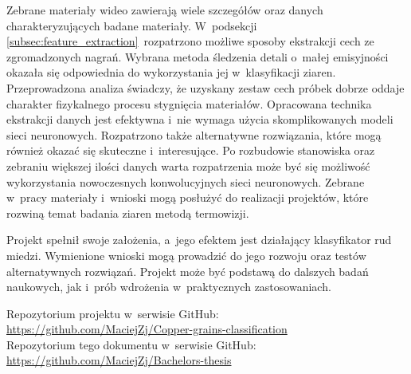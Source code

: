 Zebrane materiały wideo zawierają wiele szczegółów oraz danych
charakteryzujących badane materiały.
W~podsekcji \ref{subsec:feature_extraction}~rozpatrzono możliwe sposoby
ekstrakcji cech ze zgromadzonych nagrań.
Wybrana metoda śledzenia detali o~małej emisyjności okazała się odpowiednia
do wykorzystania jej w~klasyfikacji ziaren.
Przeprowadzona analiza świadczy, że uzyskany zestaw cech próbek dobrze oddaje
charakter fizykalnego procesu stygnięcia materiałów.
Opracowana technika ekstrakcji danych jest efektywna i~nie wymaga użycia
skomplikowanych modeli sieci neuronowych.
Rozpatrzono także alternatywne rozwiązania, które mogą również okazać się
skuteczne i~interesujące.
Po rozbudowie stanowiska oraz zebraniu większej ilości danych warta rozpatrzenia
może być się możliwość wykorzystania nowoczesnych konwolucyjnych sieci
neuronowych.
Zebrane w~pracy materiały i~wnioski mogą posłużyć do realizacji projektów, które
rozwiną temat badania ziaren metodą termowizji.

Projekt spełnił swoje założenia, a~jego efektem jest działający klasyfikator rud
miedzi.
Wymienione wnioski mogą prowadzić do jego rozwoju oraz testów alternatywnych
rozwiązań.
Projekt może być podstawą do dalszych badań naukowych, jak i~prób wdrożenia
w~praktycznych zastosowaniach.

\vspace*{\fill}%
{%
\noindent\scriptsize%
Repozytorium projektu w~serwisie GitHub: \url{https://github.com/MaciejZj/Copper-grains-classification}\\
Repozytorium tego dokumentu w~serwisie GitHub: \url{https://github.com/MaciejZj/Bachelors-thesis}
}%
\vspace*{\fill}%
